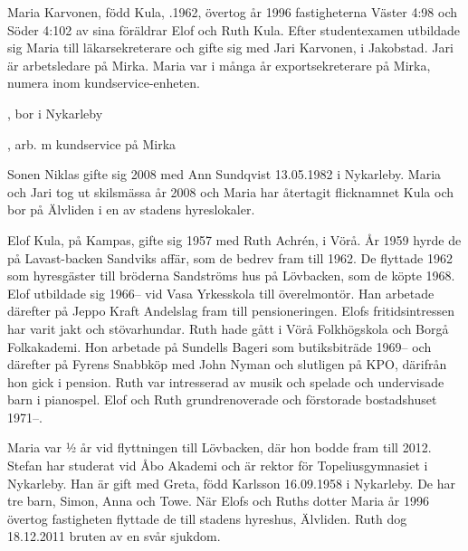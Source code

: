Maria Karvonen, född Kula, .1962, övertog år 1996 fastigheterna	Väster 4:98 och Söder 4:102 av sina föräldrar Elof och Ruth Kula. Efter studentexamen utbildade sig Maria till läkarsekreterare och gifte sig med Jari Karvonen,  i Jakobstad. Jari är arbetsledare på Mirka.
Maria var i många år exportsekreterare på Mirka, numera inom kundservice-enheten.
\begin{jhchildren}
  \item {}, bor i Nykarleby
  \item {}
  \item {}, arb. m kundservice på Mirka
\end{jhchildren}
Sonen Niklas gifte sig 2008 med Ann Sundqvist 13.05.1982 i Nykarleby. Maria och Jari tog ut skilsmässa år 2008 och Maria har återtagit flicknamnet Kula och bor på Älvliden i en av stadens hyreslokaler.


Elof Kula,  på Kampas, gifte sig 1957 med Ruth Achrén,  i Vörå.  År 1959 hyrde de på Lavast-backen Sandviks affär, som de bedrev fram till 1962. De flyttade 1962 som hyresgäster till bröderna Sandströms hus på Lövbacken, som de köpte 1968. Elof utbildade sig 1966-- vid Vasa Yrkesskola till överelmontör. Han arbetade därefter på Jeppo Kraft Andelslag fram till pensioneringen. Elofs fritidsintressen har varit jakt och stövarhundar. Ruth hade gått i Vörå Folkhögskola och Borgå Folkakademi. Hon arbetade på Sundells Bageri som butiksbiträde 1969-- och därefter på Fyrens Snabbköp med John Nyman och slutligen på KPO, därifrån hon gick i pension. Ruth var intresserad av musik och spelade och undervisade barn i pianospel. Elof och Ruth grundrenoverade och förstorade bostadshuset 1971--.
\begin{jhchildren}
  \item {}
  \item {}
\end{jhchildren}
Maria var ½ år vid flyttningen till Lövbacken, där hon bodde fram till 2012. Stefan har studerat vid Åbo Akademi och är rektor för Topeliusgymnasiet i Nykarleby. Han är gift med Greta, född Karlsson 16.09.1958 i Nykarleby. De har tre barn, Simon, Anna och Towe.	När Elofs och Ruths dotter Maria år 1996 övertog fastigheten flyttade de till stadens hyreshus,  Älvliden.  Ruth dog 18.12.2011 bruten av en svår sjukdom.


